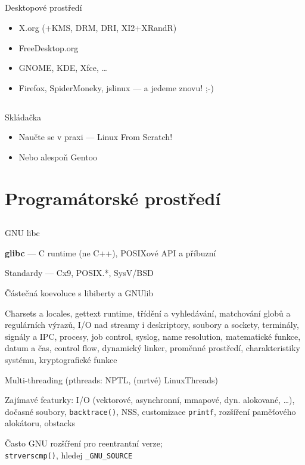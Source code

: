 \documentclass{beamer}
\begin{document}
\subsection{}
\begin{frame}{Desktopové prostředí}
\begin{itemize}
\item X.org (+KMS, DRM, DRI, XI2+XRandR)
\item FreeDesktop.org
\item GNOME, KDE, Xfce, \dots
\item Firefox, SpiderMoneky, jslinux --- a jedeme znovu! ;-)
\end{itemize}
\end{frame}

\subsection{}
\begin{frame}{Skládačka}
\begin{itemize}
\item Naučte se v praxi --- Linux From Scratch!
\item Nebo alespoň Gentoo
\end{itemize}
\end{frame}


\section{Programátorské prostředí}

\subsection{}
\begin{frame}{GNU libc}
\begin{itemize}
\item {\bf glibc} --- C runtime (ne C++), POSIXové API a příbuzní
\item Standardy --- Cx9, POSIX.*, SysV/BSD
\item Částečná koevoluce s libiberty a GNUlib
{\footnotesize \item Charsets a locales, gettext runtime, třídění a vyhledávání, matchování globů a regulárních výrazů, I/O nad streamy i deskriptory, soubory a sockety, terminály, signály a IPC, procesy, job control, syslog, name resolution, matematické funkce, datum a čas, control flow, dynamický linker, proměnné prostředí, charakteristiky systému, kryptografické funkce}
\item Multi-threading (pthreads: NPTL, (mrtvé) LinuxThreads)
\item Zajímavé featurky: I/O (vektorové, asynchronní, mmapové, dyn. alokované, \dots), dočasné soubory, {\tt backtrace()}, NSS, customizace {\tt printf}, rozšíření paměťového alokátoru, obstacks
\item Často GNU rozšíření pro reentrantní verze; \\ {\tt strverscmp()}, hledej {\tt \_GNU\_SOURCE}
\end{itemize}
\end{frame}
\end{document}
